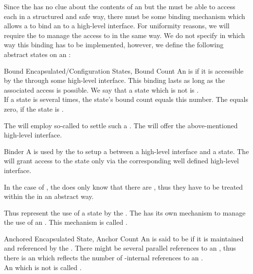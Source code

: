 \documentclass[a4paper, 12pt]{book}
\begin{document}
Since the \SYNEIGHT has no clue about the contents of an
 but the  must be able to access each
 in a structured and safe way, there must be some
binding mechanism which allows a  to bind an  to a high-level interface.
%
For uniformity reasons, we will require the \SYNEIGHT to manage the
access to  in the same way. 
%
We do not specify in which way this binding has to be implemented, however, we
define the following abstract states on an :
\begin{definition*}{Bound Encapsulated/Configuration States, Bound Count}
  An  is  if it is accessible
  by the  through some high-level interface. This binding lasts as
  long as the associated access is possible. We say that a state which
  is not  is .\\
  If a state is  several times, the state's bound count equals this
  number. The  equals zero, if the state is .
\end{definition*}
%
The  will employ so-called  to settle such a
. The  will offer the above-mentioned high-level
interface.
\begin{definition*}{Binder}
  \label{def:binder}
  A  is used by the  to setup a  between a
  high-level interface and a state. The  will grant access to the
  state only via the corresponding well defined high-level interface.
\end{definition*}
%
In the case of , the \SYNEIGHT does only know
that there are , thus they have to be treated within the
\SYNEIGHT in an abstract way.


Thus  represent the use of a state by the . The
\SYNEIGHT has its own mechanism to manage the use of an . This mechanism is called .
\begin{definition*}{Anchored Encapsulated State, Anchor Count}
  An  is said to be  if it is maintained
  and referenced by the \SYNEIGHT. There might be several parallel
  references to an , thus there is an 
  which reflects the number of \SYNEIGHT-internal references to an
  .\\
  An  which is not  is called
  . 
\end{definition*}
%
\end{document}
